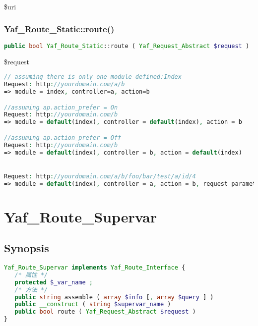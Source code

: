 \begin{compactitem}
\item \$uri
\end{compactitem}

\subsection{Yaf\_Route\_Static::route()}



\begin{lstlisting}[language=PHP]
public bool Yaf_Route_Static::route ( Yaf_Request_Abstract $request )
\end{lstlisting}

\begin{compactitem}
\item \$request
\end{compactitem}



\begin{lstlisting}[language=PHP]
// assuming there is only one module defined:Index
Request: http://yourdomain.com/a/b
=> module = index, controller=a, action=b

//assuming ap.action_prefer = On
Request: http://yourdomain.com/b
=> module = default(index), controller = default(index), action = b

//assuming ap.action_prefer = Off
Request: http://yourdomain.com/b
=> module = default(index), controller = b, action = default(index)


Request: http://yourdomain.com/a/b/foo/bar/test/a/id/4
=> module = default(index), controller = a, action = b, request parameters: foo = bar, test = a, id = 4
\end{lstlisting}

\chapter{Yaf\_Route\_Supervar}


\section{Synopsis}






\begin{lstlisting}[language=PHP]
Yaf_Route_Supervar implements Yaf_Route_Interface {
   /* 属性 */
   protected $_var_name ;
   /* 方法 */
   public string assemble ( array $info [, array $query ] )
   public __construct ( string $supervar_name )
   public bool route ( Yaf_Request_Abstract $request )
}
\end{lstlisting}


